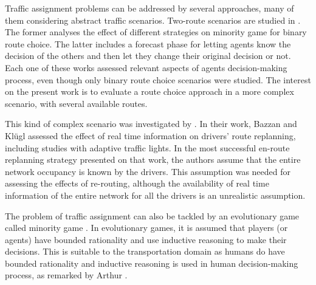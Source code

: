\documentclass{RITA}
\begin{document}



Traffic assignment problems can be addressed by several approaches, many of them considering abstract traffic scenarios. Two-route scenarios are studied in \cite{Bazzan+2000icmas,Kluegl&Bazzan2004}. The former analyses the effect of different strategies on minority game for binary route choice. The latter includes a forecast phase for letting agents know the decision of the others and then let they change their original decision or not. Each one of these works assessed relevant aspects of agents decision-making process, even though only binary route choice scenarios were studied. The interest on the present work is to evaluate a route choice approach in a more complex scenario, with several available routes.

This kind of complex scenario was investigated by \cite{Bazzan&Kluegl2008}. In their work, Bazzan and Kl\"ugl assessed the effect of real time information on drivers' route replanning, including studies with adaptive traffic lights. In the most successful en-route replanning strategy presented on that work, the authors assume that the entire network occupancy is known by the drivers. This assumption was needed for assessing the effects of re-routing, although the availability of real time information of the entire network for all the drivers is an unrealistic assumption.

The problem of traffic assignment can also be tackled by an evolutionary game called minority game \cite{Challet&Zhang1997}. In evolutionary games, it is assumed that players (or agents) have bounded rationality and use inductive reasoning to make their decisions. This is suitable to the transportation domain as humans do have bounded rationality and inductive reasoning is used in human decision-making process, as remarked by Arthur \cite{Arthur1994}.
\end{document}
